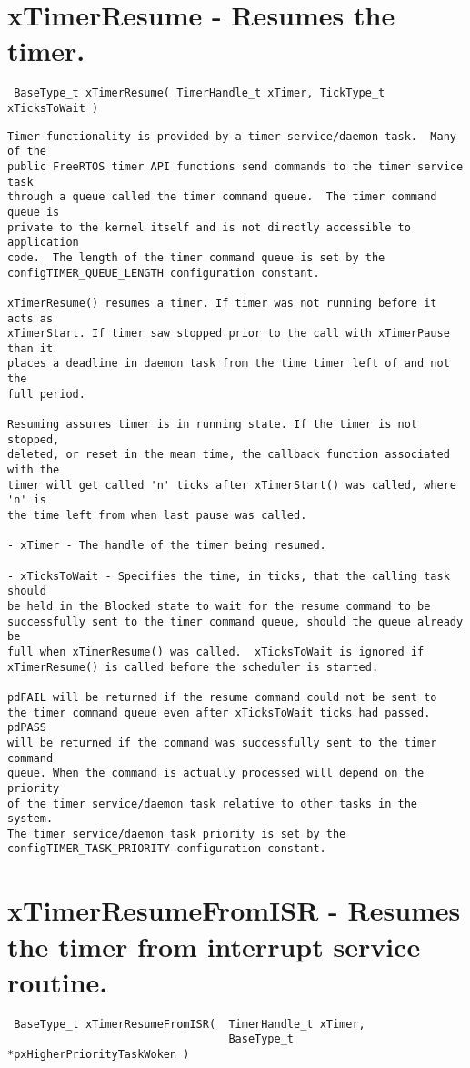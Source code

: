 \section*{xTimerResume -  Resumes the timer.}
\label{rt_cmd:xTimerResume}
\begin{verbatim}
 BaseType_t xTimerResume( TimerHandle_t xTimer, TickType_t xTicksToWait )
\end{verbatim}
\begin{lstlisting}
Timer functionality is provided by a timer service/daemon task.  Many of the
public FreeRTOS timer API functions send commands to the timer service task
through a queue called the timer command queue.  The timer command queue is
private to the kernel itself and is not directly accessible to application
code.  The length of the timer command queue is set by the
configTIMER_QUEUE_LENGTH configuration constant.

xTimerResume() resumes a timer. If timer was not running before it acts as
xTimerStart. If timer saw stopped prior to the call with xTimerPause than it
places a deadline in daemon task from the time timer left of and not the
full period.

Resuming assures timer is in running state. If the timer is not stopped,
deleted, or reset in the mean time, the callback function associated with the
timer will get called 'n' ticks after xTimerStart() was called, where 'n' is
the time left from when last pause was called.

- xTimer - The handle of the timer being resumed.

- xTicksToWait - Specifies the time, in ticks, that the calling task should
be held in the Blocked state to wait for the resume command to be
successfully sent to the timer command queue, should the queue already be
full when xTimerResume() was called.  xTicksToWait is ignored if
xTimerResume() is called before the scheduler is started.

pdFAIL will be returned if the resume command could not be sent to
the timer command queue even after xTicksToWait ticks had passed.  pdPASS
will be returned if the command was successfully sent to the timer command
queue. When the command is actually processed will depend on the priority
of the timer service/daemon task relative to other tasks in the system.
The timer service/daemon task priority is set by the
configTIMER_TASK_PRIORITY configuration constant.
\end{lstlisting}

\section{xTimerResumeFromISR -  Resumes the timer from interrupt service routine.}
\label{rt_cmd:xTimerResumeFromISR}
\begin{verbatim}
 BaseType_t xTimerResumeFromISR(  TimerHandle_t xTimer,
                                  BaseType_t *pxHigherPriorityTaskWoken )
\end{verbatim}

